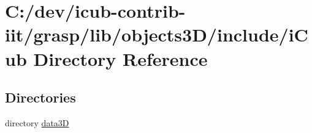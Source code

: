 \section{C\+:/dev/icub-\/contrib-\/iit/grasp/lib/objects3\+D/include/i\+Cub Directory Reference}
\label{dir_d1c8e331d6df591f0fd1c7d162279611}
\subsection*{Directories}
\begin{DoxyCompactItemize}
\item 
directory \hyperlink{dir_8caa9fbf98f851046eeef01768380c9a}{data3\+D}
\end{DoxyCompactItemize}
